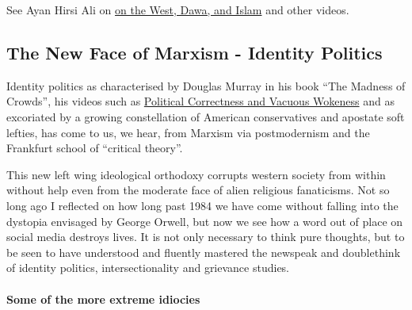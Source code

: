 \documentclass[14pt,titlepage]{extarticle}
\begin{document}
See Ayan Hirsi Ali on  \href{https://www.youtube.com/watch?v=Bx2hEc7Dlcg}{on the West, Dawa, and Islam} and other videos.

\subsection{The New Face of Marxism - Identity Politics}

Identity politics as characterised by Douglas Murray in his book ``The Madness of Crowds'', his videos such as \href{https://www.youtube.com/watch?v=m2zZMg7SNWA}{Political Correctness and Vacuous Wokeness} and as excoriated by a growing constellation of American conservatives and apostate soft lefties, has come to us, we hear, from Marxism via postmodernism and the Frankfurt school of ``critical theory''.

This new left wing ideological orthodoxy corrupts western society from within without help even from the moderate face of alien religious fanaticisms.
Not so long ago I reflected on how long past 1984 we have come without falling into the dystopia envisaged by George Orwell, but now we see how a word out of place on social media destroys lives.
It is not only necessary to think pure thoughts, but to be seen to have understood and fluently mastered the newspeak and doublethink of identity politics, intersectionality and grievance studies.

\paragraph{Some of the more extreme idiocies}
\end{document}
